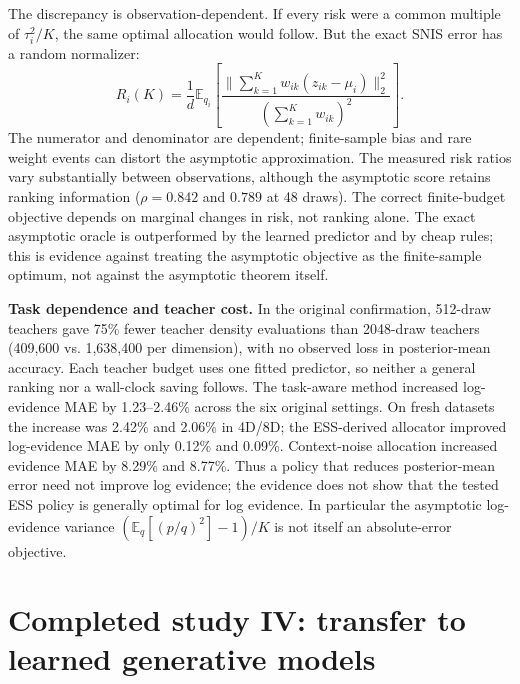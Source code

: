 \documentclass[11pt,letterpaper]{article}
\newcommand{\E}{\mathbb E}
\newcommand{\norm}[1]{\lVert #1\rVert_2}
\begin{document}
The discrepancy is observation-dependent. If every risk were a common multiple of $\tau_i^2/K$, the same optimal allocation would follow. But the exact SNIS error has a random normalizer:
\begin{equation}
 R_i(K)=\frac1d\E_{q_i}\left[\frac{\norm{\sum_{k=1}^{K} w_{ik}(z_{ik}-\mu_i)}^2}{(\sum_{k=1}^{K}w_{ik})^2}\right].
\end{equation}
The numerator and denominator are dependent; finite-sample bias and rare weight events can distort the asymptotic approximation. The measured risk ratios vary substantially between observations, although the asymptotic score retains ranking information ($\rho=0.842$ and $0.789$ at 48 draws). The correct finite-budget objective depends on marginal changes in risk, not ranking alone. The exact asymptotic oracle is outperformed by the learned predictor and by cheap rules; this is evidence against treating the asymptotic objective as the finite-sample optimum, not against the asymptotic theorem itself.

\textbf{Task dependence and teacher cost.} In the original confirmation, 512-draw teachers gave 75\% fewer teacher density evaluations than 2048-draw teachers (409,600 vs. 1,638,400 per dimension), with no observed loss in posterior-mean accuracy. Each teacher budget uses one fitted predictor, so neither a general ranking nor a wall-clock saving follows. The task-aware method increased log-evidence MAE by 1.23--2.46\% across the six original settings. On fresh datasets the increase was 2.42\% and 2.06\% in 4D/8D; the ESS-derived allocator improved log-evidence MAE by only 0.12\% and 0.09\%. Context-noise allocation increased evidence MAE by 8.29\% and 8.77\%. Thus a policy that reduces posterior-mean error need not improve log evidence; the evidence does not show that the tested ESS policy is generally optimal for log evidence. In particular the asymptotic log-evidence variance $(\E_q[(p/q)^2]-1)/K$ is not itself an absolute-error objective.
\clearpage
\section{Completed study IV: transfer to learned generative models}
\end{document}
